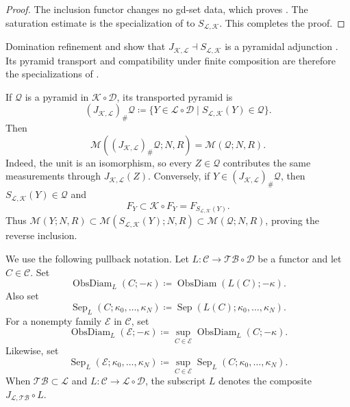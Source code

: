 \documentclass{amsart}
\theoremstyle{plain}
\theoremstyle{definition}
\theoremstyle{remark}
\newcommand{\D}{\mathcal{D}}
\newcommand{\M}{\mathcal{M}}
\renewcommand{\L}{\mathcal{L}}
\newcommand{\K}{\mathcal{K}}
\newcommand{\TB}{\mathcal{TB}}
\DeclareMathOperator{\od}{ObsDiam}
\begin{document}
\begin{proof}
The inclusion functor changes no gd-set data, which proves
.  The saturation estimate
 is the specialization of
\cite[Lemma~4.6]{gds2} to $S_{\L,\K}$.
	This completes the proof.
\end{proof}

Domination refinement
\cite[Lemma~5.4]{gds2} and
 show that
$J_{\K,\L}\dashv S_{\L,\K}$ is a pyramidal adjunction
\cite[Definition~A.5]{gds3-ja}.  Its pyramid transport and compatibility
under finite composition are therefore the specializations of
\cite[Theorem~A.7 and Proposition~A.8]{gds3-ja}.

If $\mathcal Q$ is a pyramid in $\K\circ\D$, its transported pyramid is
\[ (J_{\K,\L})_{\#}\mathcal Q \coloneqq\{Y\in\L\circ\D\mid S_{\L,\K}(Y)\in\mathcal Q\}. \]
Then
\begin{equation}
\label{eq:coarsening-pyramid-measurement}
\M((J_{\K,\L})_{\#}\mathcal Q;N,R)=\M(\mathcal Q;N,R).
\end{equation}
Indeed, the unit is an isomorphism, so every $Z\in\mathcal Q$ contributes
the same measurements through $J_{\K,\L}(Z)$.  Conversely, if
$Y\in(J_{\K,\L})_{\#}\mathcal Q$, then $S_{\L,\K}(Y)\in\mathcal Q$ and
\[
F_Y\subset\K\circ F_Y=F_{S_{\L,\K}(Y)}.
\]
Thus
$\M(Y;N,R)\subset\M(S_{\L,\K}(Y);N,R)
\subset\M(\mathcal Q;N,R)$, proving the reverse inclusion.

We use the following pullback notation.  Let
$L\colon\mathcal C\to\TB\circ\D$ be a functor and let
$C\in\mathcal C$.  Set
\[
\od_L(C;-\kappa)\coloneqq\od(L(C);-\kappa).
\]
Also set
\[
\operatorname{Sep}_L(C;\kappa_0,\ldots,\kappa_N)
\coloneqq\operatorname{Sep}(L(C);\kappa_0,\ldots,\kappa_N).
\]
For a nonempty family $\mathcal E$ in $\mathcal C$, set
\[ \od_L(\mathcal E;-\kappa)\coloneqq \sup_{C\in\mathcal E}\od_L(C;-\kappa). \]
Likewise, set
\[
\operatorname{Sep}_L(\mathcal E;\kappa_0,\ldots,\kappa_N)
\coloneqq\sup_{C\in\mathcal E}
\operatorname{Sep}_L(C;\kappa_0,\ldots,\kappa_N).
\]
When $\TB\subset\mathcal L$ and
$L\colon\mathcal C\to\mathcal L\circ\D$, the subscript $L$ denotes the
composite $J_{\mathcal L,\TB}\circ L$.
\end{document}
